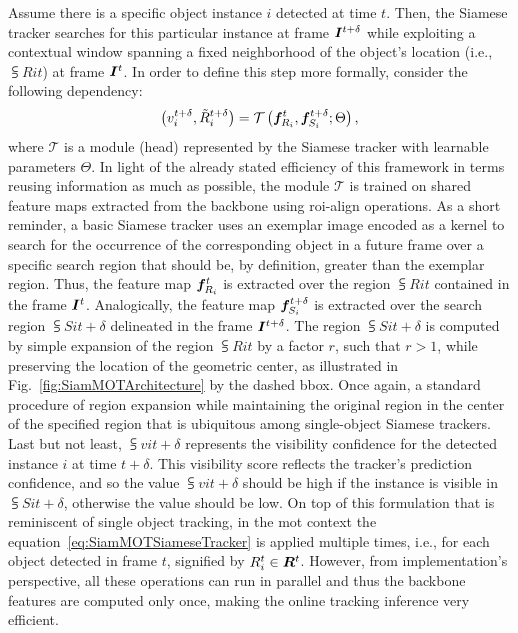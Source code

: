 Assume there is a specific object instance $i$ detected at time $t$. Then, the Siamese tracker searches for this particular instance at frame $\bm{I}^{t + \delta}$ while exploiting a contextual window spanning a fixed neighborhood of the object's location (i.e., $\subsup{R}{i}{t}$) at frame $\bm{I}^{t}$. In order to define this step more formally, consider the following dependency:
\begin{equation}
    \label{eq:SiamMOTSiameseTracker}
    \left( {
        {v}_{i}^{t + \delta},
        {\tilde{R}}_{i}^{t + \delta}
    } \right) =
    {\mathcal{T}} \left( 
        \bm{f}_{R_i}^{t}, \bm{f}_{S_i}^{t + \delta}; \Theta
     \right),
\end{equation}
where $\mathcal{T}$ is a module (head) represented by the Siamese tracker with learnable parameters $\Theta$. In light of the already stated efficiency of this framework in terms reusing information as much as possible, the module $\mathcal{T}$ is trained on shared feature maps extracted from the backbone using \gls{roi}-align operations. As a short reminder, a basic Siamese tracker uses an exemplar image encoded as a kernel to search for the occurrence of the corresponding object in a future frame over a specific search region that should be, by definition, greater than the exemplar region. Thus, the feature map $\bm{f}_{R_i}^{t}$ is extracted over the region $\subsup{R}{i}{t}$ contained in the frame $\bm{I}^{t}$. Analogically, the feature map $\bm{f}_{S_i}^{t + \delta}$ is extracted over the search region $\subsup{S}{i}{t + \delta}$ delineated in the frame $\bm{I}^{t + \delta}$. The region $\subsup{S}{i}{t + \delta}$ is computed by simple expansion of the region $\subsup{R}{i}{t}$ by a factor $r$, such that $r > 1$, while preserving the location of the geometric center, as illustrated in Fig.~\ref{fig:SiamMOTArchitecture} by the dashed \gls{bbox}. Once again, a standard procedure of region expansion while maintaining the original region in the center of the specified region that is ubiquitous among single-object Siamese trackers. Last but not least, $\subsup{v}{i}{t + \delta}$ represents the visibility confidence for the detected instance $i$ at time $t + \delta$. This visibility score reflects the tracker's prediction confidence, and so the value $\subsup{v}{i}{t + \delta}$ should be high if the instance is visible in $\subsup{S}{i}{t + \delta}$, otherwise the value should be low. On top of this formulation that is reminiscent of single object tracking, in the \gls{mot} context the equation~\ref{eq:SiamMOTSiameseTracker} is applied multiple times, i.e., for each object detected in frame $t$, signified by ${R}_{i}^{t} \in \bm{R}^{t}$. However, from implementation's perspective, all these operations can run in parallel and thus the backbone features are computed only once, making the online tracking inference very efficient.

